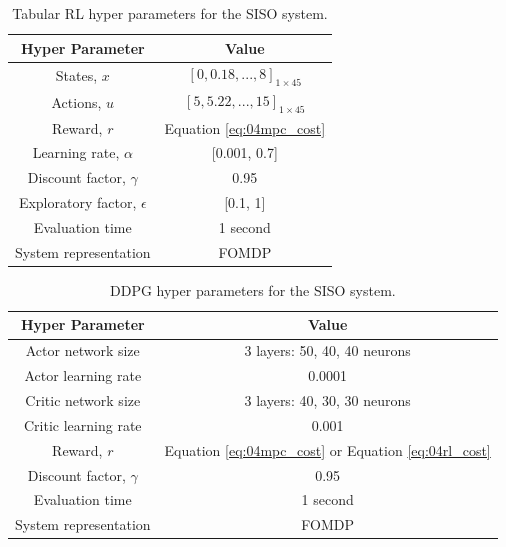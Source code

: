 \begin{table}[H]
\caption{Tabular RL hyper parameters for the SISO system.}
\label{tab:04tab_rl}
\centering
\begin{tabular}{c|c}
\textbf{Hyper Parameter}     & \textbf{Value}  \\
\hline
States, $x$	             	& $[0, 0.18, ..., 8]_{1 \times 45} $		 \\
Actions, $u$               & $[5, 5.22, ..., 15]_{1 \times 45}$		\\
Reward, $r$	               & Equation \ref{eq:04mpc_cost}		\\
Learning rate, $\alpha$		& [0.001, 0.7]		 \\
Discount factor, $\gamma$      	& 0.95  \\
Exploratory factor, $\epsilon$             & [0.1, 1]  \\
Evaluation time                 & 1 second \\
System representation           & FOMDP \\
\end{tabular}
\end{table}

\begin{table}[H]
\caption{DDPG hyper parameters for the SISO system.}
\label{tab:04deep_rl}
\centering
\begin{tabular}{c|c}
\textbf{Hyper Parameter}     & \textbf{Value}  \\
\hline
Actor network size	             & 3 layers: 50, 40, 40 neurons		 \\
Actor learning rate              & 0.0001		\\
Critic network size	             & 3 layers: 40, 30, 30 neurons		\\
Critic learning rate       		 & 0.001		 \\
Reward, $r$	                     & Equation \ref{eq:04mpc_cost}	or Equation \ref{eq:04rl_cost}	\\
Discount factor, $\gamma$      	& 0.95  \\
Evaluation time                 & 1 second \\
System representation           & FOMDP \\
\end{tabular}
\end{table}

